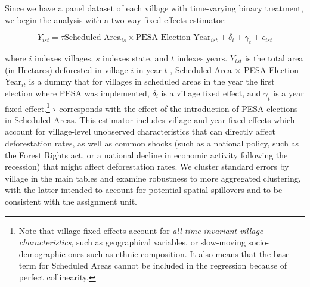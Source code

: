 \documentclass[12pt,reqno]{article}
\begin{document}


Since we have a panel dataset of each village with time-varying binary treatment, we begin the analysis with a two-way fixed-effects estimator:

\begin{equation}\label{base}
Y_{ist} = \tau \text{Scheduled Area}_{is} \times
\text{PESA Election Year}_{ist} +  \delta_i + \gamma_t +  \epsilon_{ist}
\end{equation}

where $i$ indexes villages, $s$ indexes state, and $t$ indexes years. $Y_{ist}$ is the total area (in Hectares) deforested in village $i$ in year $t$ , Scheduled Area $\times$ PESA Election Year$_{it}$ is a dummy that for villages in scheduled areas in the year the first election where PESA was implemented, $\delta_i$ is a village fixed effect, and $\gamma_t$ is a year fixed-effect.\footnote{Note that village fixed effects account for \emph{all time invariant village characteristics}, such as geographical variables, or slow-moving socio-demographic ones such as ethnic composition. It also means that the base term for Scheduled Areas cannot be included in the regression because of perfect collinearity.} $\tau$ corresponds with the effect of the introduction of PESA elections in Scheduled Areas. This estimator includes village and year fixed effects which account for village-level unobserved characteristics that can directly affect deforestation rates, as well as common shocks (such as a national policy, such as the Forest Rights act, or a national decline in economic activity following the recession) that might affect deforestation rates. We cluster standard errors by village in the main tables and examine robustness to more aggregated clustering, with the latter intended to account for potential spatial spillovers and to be consistent with the assignment unit.  
\end{document}
